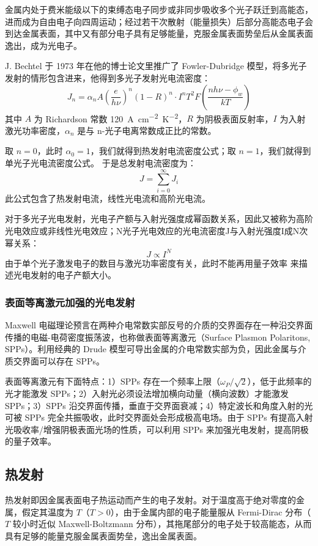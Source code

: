 金属内处于费米能级以下的束缚态电子同步或非同步吸收多个光子跃迁到高能态，进而成为自由电子向四周运动；经过若干次散射（能量损失）后部分高能态电子会到达金属表面，其中又有部分电子具有足够能量，克服金属表面势垒后从金属表面逸出，成为光电子。

	J. Bechtel 于 1973 年在他的博士论文里推广了 Fowler-Dubridge 模型，将多光子发射的情形包含进来，他得到多光子发射光电流密度：
\begin{equation}
J_n = \alpha_nA\left(\frac{e}{h\nu}\right)^n(1-R)^n\cdot I^nT^2F\left(\frac{nh\nu-\phi_w}{kT}\right)
\label{eq:multi-emission}
\end{equation}
其中 $A$ 为 Richardson 常数 \SI{120}{A.cm^{-2}.K^{-2}}，$R$ 为阴极表面反射率，$I$ 为入射激光功率密度，$\alpha_n$ 是与 n-光子电离常数成正比的常数。
	
	取 $n=0$，此时 $\alpha_0 = 1$，我们就得到热发射电流密度公式；取 $n=1$，我们就得到单光子光电流密度公式。
	于是总发射电流密度为：
	\begin{equation}
	J = \sum_{i = 0}^{\infty}J_i
	\end{equation}
	此公式包含了热发射电流，线性光电流和高阶光电流。

对于多光子光电发射，光电子产额与入射光强度成幂函数关系，因此又被称为高阶光电效应或非线性光电效应；N光子光电效应的光电流密度J与入射光强度I成N次幂关系：
\[
J \propto I^N
\]
由于单个光子激发电子的数目与激光功率密度有关，此时不能再用量子效率	来描述光电发射的电子产额大小。

\subsubsection{表面等离激元加强的光电发射}
Maxwell 电磁理论预言在两种介电常数实部反号的介质的交界面存在一种沿交界面传播的电磁-电荷密度振荡波，也称做表面等离激元（Surface Plasmon Polaritons, SPPs）。利用经典的 Drude 模型可导出金属的介电常数实部为负，因此金属与介质交界面可以存在 SPPs。

表面等离激元有下面特点：1）SPPs 存在一个频率上限（$\omega_P/\sqrt{2}$），低于此频率的光才能激发 SPPs；2）入射光必须设法增加横向动量（横向波数）才能激发 SPPs；3）SPPs 沿交界面传播，垂直于交界面衰减；4）特定波长和角度入射的光可被 SPPs 完全共振吸收，此时交界面处会形成极高电场。由于 SPPs 有提高入射光吸收率/增强阴极表面光场的性质，可以利用 SPPs 来加强光电发射，提高阴极的量子效率。

\subsection{热发射}
热发射即因金属表面电子热运动而产生的电子发射。对于温度高于绝对零度的金属，假定其温度为 $T$（$T > 0$），由于金属内部的电子能量服从 Fermi-Dirac 分布（$T$ 较小时近似 Maxwell-Boltzmann 分布），其拖尾部分的电子处于较高能态，从而具有足够的能量克服金属表面势垒，逸出金属表面。

